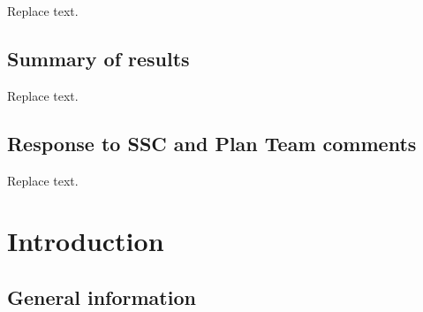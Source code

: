 \documentclass[11pt,
  english,
  a4paper,
]{article}
\begin{document}
\leavevmode\tagmcend\tagstructend


Replace text.

\leavevmode\tagmcend\tagstructend\par


\hypertarget{summary-of-results}{%
\subsection*{Summary of results}\label{summary-of-results}}

\leavevmode\tagmcend\tagstructend


Replace text.

\leavevmode\tagmcend\tagstructend\par


\hypertarget{response-to-ssc-and-plan-team-comments}{%
\subsection*{Response to SSC and Plan Team comments}\label{response-to-ssc-and-plan-team-comments}}

\leavevmode\tagmcend\tagstructend


Replace text.

\leavevmode\tagmcend\tagstructend\par


\hypertarget{introduction}{%
\section{Introduction}\label{introduction}}

\leavevmode\tagmcend\tagstructend


\hypertarget{general-information}{%
\subsection{General information}\label{general-information}}
\end{document}
